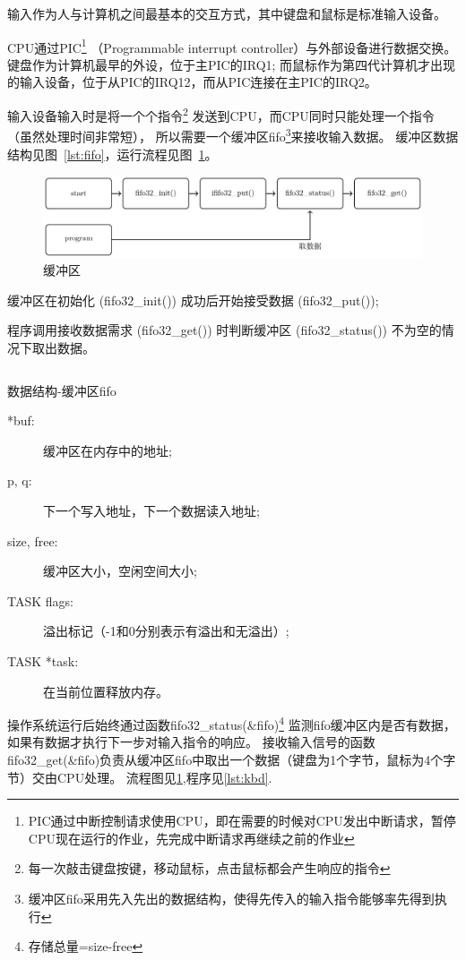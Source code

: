 输入作为人与计算机之间最基本的交互方式，其中键盘和鼠标是标准输入设备。

CPU通过PIC\footnote{PIC通过中断控制请求使用CPU，即在需要的时候对CPU发出中断请求，暂停CPU现在运行的作业，先完成中断请求再继续之前的作业}
（Programmable interrupt controller）与外部设备进行数据交换。
键盘作为计算机最早的外设，位于主PIC的IRQ1;
而鼠标作为第四代计算机才出现的输入设备，位于从PIC的IRQ12，而从PIC连接在主PIC的IRQ2。

输入设备输入时是将一个个指令\footnote{每一次敲击键盘按键，移动鼠标，点击鼠标都会产生响应的指令}
发送到CPU，而CPU同时只能处理一个指令（虽然处理时间非常短），
所以需要一个缓冲区fifo\footnote{缓冲区fifo采用先入先出的数据结构，使得先传入的输入指令能够率先得到执行}来接收输入数据。
缓冲区数据结构见图~\ref{lst:fifo}，运行流程见图~\ref{fig:fifo}。

\begin{figure}[H]
    \centering
    \includegraphics[width=\textwidth]{fig/func/fifo.pdf}
    \caption{缓冲区}
    \label{fig:fifo}
\end{figure}
缓冲区在初始化 (fifo32\_init()) 成功后开始接受数据 (fifo32\_put());

程序调用接收数据需求 (fifo32\_get()) 时判断缓冲区 (fifo32\_status()) 不为空的情况下取出数据。
\begin{listing}[H]
  \inputminted[tabsize=2, firstline=40, lastline=44,
    linenos=true]{c}{../ZOS/src/kernel/bootpack.h}
  \caption{数据结构-缓冲区fifo}
  \label{lst:fifo}
\end{listing}
\begin{description}
\item[*buf:]缓冲区在内存中的地址;
\item[p, q:]下一个写入地址，下一个数据读入地址;
\item[size, free:]缓冲区大小，空闲空间大小;
\item[TASK flags:]溢出标记（-1和0分别表示有溢出和无溢出）;
\item[TASK *task:]在当前位置释放内存。
\end{description}

操作系统运行后始终通过函数fifo32\_status(\&fifo)\footnote{存储总量=size-free}
监测fifo缓冲区内是否有数据，如果有数据才执行下一步对输入指令的响应。
接收输入信号的函数fifo32\_get(\&fifo)负责从缓冲区fifo中取出一个数据（键盘为1个字节，鼠标为4个字节）交由CPU处理。
流程图见\ref{fig:fifo},程序见\ref{lst:kbd}.

